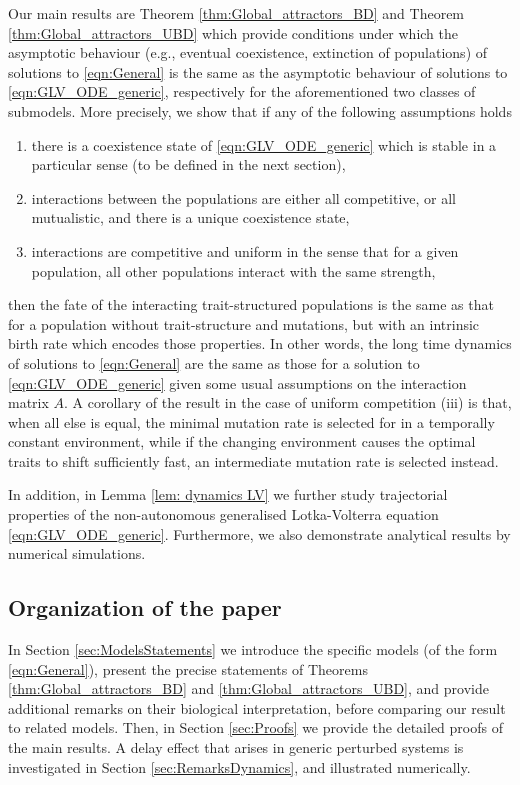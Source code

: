 \documentclass{article}
\begin{document}
Our main results are Theorem \ref{thm:Global_attractors_BD} and Theorem \ref{thm:Global_attractors_UBD} which provide conditions under which the asymptotic behaviour (e.g., eventual coexistence, extinction of populations) of solutions to \eqref{eqn:General} is the same as the asymptotic behaviour of solutions to \eqref{eqn:GLV_ODE_generic}, respectively for the aforementioned two classes of submodels. More precisely, we show that if any of the following assumptions holds
\begin{enumerate}
    \item[(a)] there is a coexistence state of \eqref{eqn:GLV_ODE_generic} which is stable in a particular sense (to be defined in the next section),
    \item[(b)] interactions between the populations are either all competitive, or all mutualistic, and there is a unique coexistence state,
    \item[(c)] interactions are competitive and uniform in the sense that for a given population, all other populations interact with the same strength,
\end{enumerate}
then the fate of the interacting trait-structured populations is the same as that for a population without trait-structure and mutations, but with an intrinsic birth rate which encodes those properties. In other words, the long time dynamics of solutions to \eqref{eqn:General} are the same as those for a solution to \eqref{eqn:GLV_ODE_generic} given some usual assumptions on  the interaction matrix $A$. A corollary of the result in the case of uniform competition (iii) is that, when all else is equal, the minimal mutation rate is selected for in a temporally constant environment, while if the changing environment causes the optimal traits to shift sufficiently fast, an intermediate mutation rate is selected instead.

In addition, in Lemma \ref{lem: dynamics LV} we further study trajectorial properties of the non-autonomous generalised Lotka-Volterra equation \eqref{eqn:GLV_ODE_generic}. Furthermore, we also demonstrate analytical results by numerical simulations.   
\subsection{Organization of the paper}
In Section \ref{sec:ModelsStatements} we introduce the specific models (of the form \eqref{eqn:General}), present  the precise statements of Theorems \ref{thm:Global_attractors_BD} and \ref{thm:Global_attractors_UBD}, and provide additional remarks on their biological interpretation, before comparing our result to related models. Then, in Section \ref{sec:Proofs} we provide the detailed proofs of the main results. A delay effect that arises in generic perturbed systems is investigated in Section \ref{sec:RemarksDynamics}, and illustrated numerically. 
\end{document}

